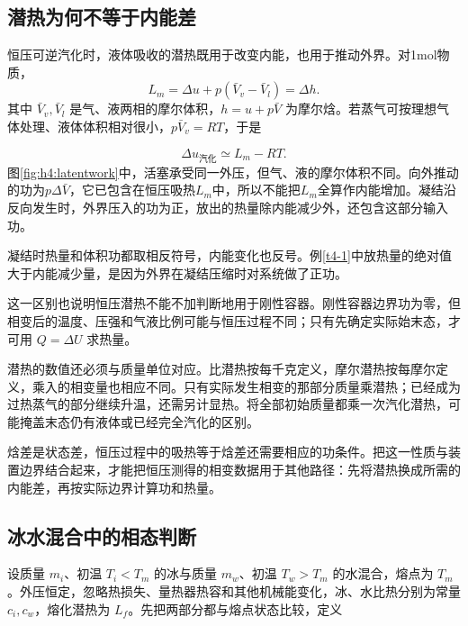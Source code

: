 \subsection{潜热为何不等于内能差}
恒压可逆汽化时，液体吸收的潜热既用于改变内能，也用于推动外界。对1mol物质，
\[L_m=\Delta u+p(\bar V_v-\bar V_l)=\Delta h.
\]
其中 $\bar V_v,\bar V_l$ 是气、液两相的摩尔体积，$h=u+p\bar V$ 为摩尔焓。若蒸气可按理想气体处理、液体体积相对很小，$p\bar V_v=RT$，于是

\[\boxed{\Delta u_{\text{汽化}}\simeq L_m-RT}.
\]
图\ref{fig:h4:latentwork}中，活塞承受同一外压，但气、液的摩尔体积不同。向外推动的功为$p\Delta\bar V$，它已包含在恒压吸热$L_m$中，所以不能把$L_m$全算作内能增加。凝结沿反向发生时，外界压入的功为正，放出的热量除内能减少外，还包含这部分输入功。



凝结时热量和体积功都取相反符号，内能变化也反号。例\ref{t4-1}中放热量的绝对值大于内能减少量，是因为外界在凝结压缩时对系统做了正功。

这一区别也说明恒压潜热不能不加判断地用于刚性容器。刚性容器边界功为零，但相变后的温度、压强和气液比例可能与恒压过程不同；只有先确定实际始末态，才可用 $Q=\Delta U$ 求热量。


潜热的数值还必须与质量单位对应。比潜热按每千克定义，摩尔潜热按每摩尔定义，乘入的相变量也相应不同。只有实际发生相变的那部分质量乘潜热；已经成为过热蒸气的部分继续升温，还需另计显热。将全部初始质量都乘一次汽化潜热，可能掩盖末态仍有液体或已经完全汽化的区别。


焓差是状态差，恒压过程中的吸热等于焓差还需要相应的功条件。把这一性质与装置边界结合起来，才能把恒压测得的相变数据用于其他路径：先将潜热换成所需的内能差，再按实际边界计算功和热量。

\subsection{冰水混合中的相态判断}
设质量 $m_i$、初温 $T_i<T_m$ 的冰与质量 $m_w$、初温 $T_w>T_m$ 的水混合，熔点为 $T_m$。外压恒定，忽略热损失、量热器热容和其他机械能变化，冰、水比热分别为常量 $c_i,c_w$，熔化潜热为 $L_f$。先把两部分都与熔点状态比较，定义

